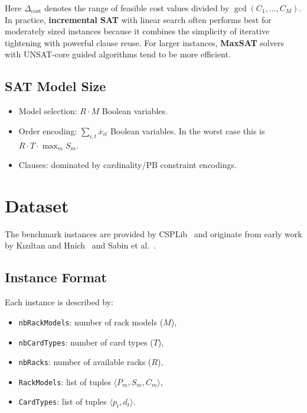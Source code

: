 \documentclass[11pt,a4paper]{article}
\begin{document}
\noindent
Here $\Delta_{\text{cost}}$ denotes the range of feasible cost values
divided by $\gcd(C_1,\dots,C_M)$.
In practice, \textbf{incremental SAT} with linear search often
performs best for moderately sized instances because it combines
the simplicity of iterative tightening with powerful clause reuse.
For larger instances, \textbf{MaxSAT} solvers with UNSAT-core
guided algorithms tend to be more efficient.

\subsection{SAT Model Size}

\begin{itemize}
  \item Model selection: $R \cdot M$ Boolean variables.
  \item Order encoding: $\sum_{i,t} \overline{x}_{it}$ Boolean variables.
        In the worst case this is $R \cdot T \cdot \max_m S_m$.
  \item Clauses: dominated by cardinality/PB constraint encodings.
\end{itemize}

\section{Dataset}
\label{sec:dataset}

The benchmark instances are provided by CSPLib~\cite{csplib}
and originate from early work by
Kızıltan and Hnich~\cite{Kiziltan01symmetrybreaking} and
Sabin et al.~\cite{sabin1999optimization}.

\subsection{Instance Format}

Each instance is described by:
\begin{itemize}
  \item \texttt{nbRackModels}: number of rack models ($M$),
  \item \texttt{nbCardTypes}: number of card types ($T$),
  \item \texttt{nbRacks}: number of available racks ($R$),
  \item \texttt{RackModels}: list of tuples
        $\langle P_m, S_m, C_m \rangle$,
  \item \texttt{CardTypes}: list of tuples
        $\langle p_t, d_t \rangle$.
\end{itemize}
\end{document}
